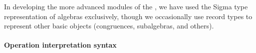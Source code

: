 
In developing the more advanced modules of the \agdaualib, we have used the Sigma type representation of algebras exclusively, though we occasionally use record types to represent other basic objects (congruences, subalgebras, and others).



\paragraph*{Operation interpretation syntax}\label{operation-interpretation-syntax}

